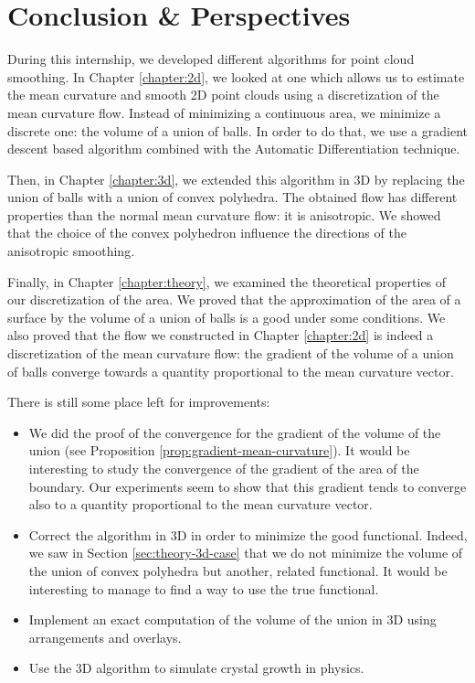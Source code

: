 \chapter{Conclusion \& Perspectives}

During this internship, we developed different algorithms for point cloud
smoothing. In Chapter \ref{chapter:2d}, we looked at one which allows us to
estimate the mean curvature and smooth 2D point clouds using a discretization of
the mean curvature flow. Instead of minimizing a continuous area, we minimize a
discrete one: the volume of a union of balls. In order to do that, we use a
gradient descent based algorithm combined with the Automatic Differentiation
technique.

Then, in Chapter \ref{chapter:3d}, we extended this algorithm in 3D by replacing
the union of balls with a union of convex polyhedra. The obtained flow has
different properties than the normal mean curvature flow: it is anisotropic. We
showed that the choice of the convex polyhedron influence the directions of the
anisotropic smoothing.

Finally, in Chapter \ref{chapter:theory}, we examined the theoretical properties
of our discretization of the area. We proved that the approximation of the area
of a surface by the volume of a union of balls is a good under some conditions.
We also proved that the flow we constructed in Chapter \ref{chapter:2d} is
indeed a discretization of the mean curvature flow: the gradient of the volume
of a union of balls converge towards a quantity proportional to the mean
curvature vector.

There is still some place left for improvements:
\begin{itemize}
    \item We did the proof of the convergence for the gradient of the volume of
        the union (see Proposition \ref{prop:gradient-mean-curvature}). It would
        be interesting to study the convergence of the gradient of the area of
        the boundary. Our experiments seem to show that this gradient tends to
        converge also to a quantity proportional to the mean curvature vector.
    \item Correct the algorithm in 3D in order to minimize the good functional.
        Indeed, we saw in Section \ref{sec:theory-3d-case} that we do not
        minimize the volume of the union of convex polyhedra but another,
        related functional. It would be interesting to manage to find a way to
        use the true functional.
    \item Implement an exact computation of the volume of the union in 3D using
        arrangements and overlays.
    \item Use the 3D algorithm to simulate crystal growth in physics.
\end{itemize}

